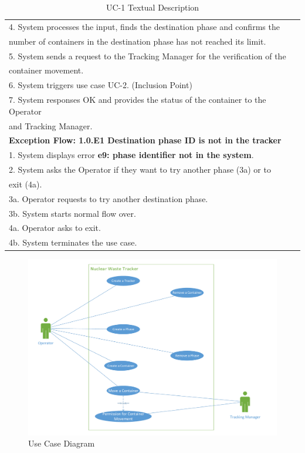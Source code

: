 \begin{table}[h]
\begin{center}
\begin{tabular}{|l|l|}
\\ 4. System processes the input, finds the destination phase and confirms the \\number of containers in the destination phase has not reached its limit.
\\ 5. System sends a request to the Tracking Manager for the verification of the \\container movement.
\\ 6. System triggers use case UC-2. (Inclusion Point)
\\ 7. System responses OK and provides the status of the container to the Operator \\and Tracking Manager.  \\ \hline
\textbf{Exception Flow: 1.0.E1 Destination phase ID is not in the tracker}
\\ 1. System displays error \textbf{e9: phase identifier not in the system}.
\\ 2. System asks the Operator if they want to try another phase (3a) or to \\exit (4a).
\\ 3a. Operator requests to try another destination phase.
\\ 3b. System starts normal flow over.
\\ 4a. Operator asks to exit.
\\ 4b. System terminates the use case.\\ \hline
\end{tabular}
\end{center}
\caption {UC-1 Textual Description}
\label{tbl:uc1td}
\end{table}

\clearpage
\newpage

\begin{figure}[!htb]
\begin{center}
\includegraphics[width=.99\textwidth]{images/uc_diagram.pdf}
\end{center}
\caption{Use Case Diagram}
\label{fig:uc_diagram}
\end{figure}

